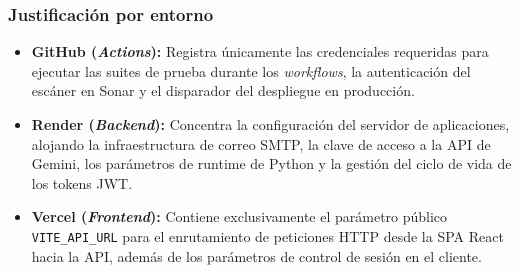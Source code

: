 \begin{table}[H]
\centering
\small
\renewcommand{\arraystretch}{1.4}
\caption{Variables de entorno y secretos por plataforma.}
\label{tab:distribucion_secretos}
\end{table}

\subsubsection{Justificación por entorno}
\begin{itemize}
    \item \textbf{GitHub (\textit{Actions}):} Registra únicamente las credenciales requeridas para ejecutar las suites de prueba durante los \textit{workflows}, la autenticación del escáner en Sonar y el disparador del despliegue en producción.
    \item \textbf{Render (\textit{Backend}):} Concentra la configuración del servidor de aplicaciones, alojando la infraestructura de correo SMTP, la clave de acceso a la API de Gemini, los parámetros de runtime de Python y la gestión del ciclo de vida de los tokens JWT.
    \item \textbf{Vercel (\textit{Frontend}):} Contiene exclusivamente el parámetro público \texttt{VITE\_API\_URL} para el enrutamiento de peticiones HTTP desde la SPA React hacia la API, además de los parámetros de control de sesión en el cliente.
\end{itemize}
